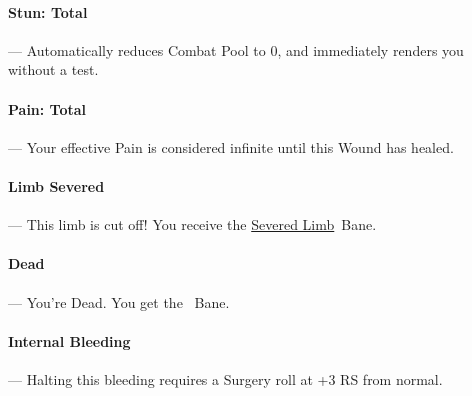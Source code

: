 \documentclass[oneside,11pt,english]{book}
\begin{document}
\vspace{-5pt}\paragraph[Total]{\label{par:Stun: Total}Stun: Total}---\quad
Automatically reduces Combat Pool to 0, and immediately renders you  without a test.

\vspace{-5pt}\paragraph[Total]{\label{par:Pain: Total}Pain: Total}---\quad
Your effective Pain is considered infinite until this Wound has healed.

\vspace{-5pt}\paragraph[Limb Severed!]{\label{par:Limb Severed}Limb Severed}---\quad
This limb is cut off! You receive the \hyperref[bane:Severed Limb/Appendage]{Severed Limb}~Bane. 

\vspace{-5pt}\paragraph{\label{par:Dead}Dead}---\quad
You’re Dead. You get the ~Bane.

\vspace{-5pt}\paragraph{\label{par:Internal Bleeding}Internal Bleeding}---\quad
Halting this bleeding requires a Surgery roll at +3 RS from normal.
\newpage
		\captionsetup{font=small} %
\end{document}
